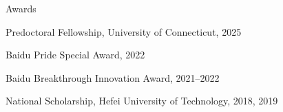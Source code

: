 \documentclass[]{resume}
\newcommand{\sectionvspace}{\vspace{1.5pt}}
\begin{document}
\begin{rSection}{Awards}\sectionvspace
\item Predoctoral Fellowship, University of Connecticut, 2025
\item Baidu Pride Special Award, 2022
\item Baidu Breakthrough Innovation Award, 2021--2022
\item National Scholarship, Hefei University of Technology, 2018, 2019
\end{rSection}
\end{document}
